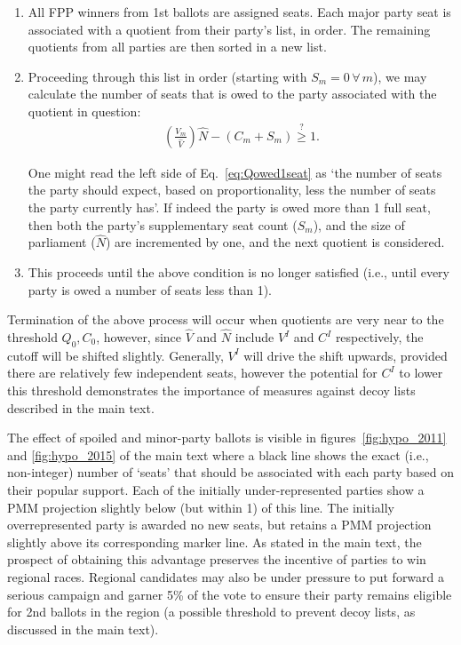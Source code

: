 \begin{enumerate}
\item All FPP winners from 1st ballots are assigned seats. 
Each major party seat is associated with a quotient from their party's list, in order. The remaining quotients from all parties are then sorted in a new list.

\item Proceeding through this list in order (starting with $S_m=0 \, \forall \, m$), we may calculate the number of seats that is owed to the party associated with the quotient in question:
\begin{align}
\left(\frac{V_m}{\hat{V}}\right) \hat{N} -(C_m+S_m)\stackrel{?}{\ge} 1.
\label{eq:Qowed1seat}
\end{align} 

One might read the left side of Eq.~\ref{eq:Qowed1seat} as `the number of seats the party should expect, based on proportionality, less the number of seats the party currently has'.
If indeed the party is owed more than 1 full seat, then both the party's supplementary seat count ($S_m$), and the size of parliament ($\hat{N}$) are incremented by one, and the next quotient is considered. 

\item This proceeds until the above condition is no longer satisfied (i.e., until every party is owed a number of seats less than 1). 
\end{enumerate}

Termination of the above process will occur when quotients are very near to the threshold $Q_0,C_0$, however, since $\hat{V}$ and $\hat{N}$ include $V^I$ and $C^I$ respectively, the cutoff will be shifted slightly.
Generally, $V^I$ will drive the shift upwards, provided there are relatively few independent seats, however the potential for $C^I$ to lower this threshold demonstrates the importance of measures against decoy lists described in the main text.

The effect of spoiled and minor-party ballots is visible in figures~\ref{fig:hypo_2011} and \ref{fig:hypo_2015} of the main text where a black line shows the exact (i.e., non-integer) number of `seats' that should be associated with each party based on their popular support. 
Each of the initially under-represented parties show a PMM projection slightly below (but within 1) of this line. The initially overrepresented party is awarded no new seats, but retains a PMM projection slightly above its corresponding marker line.
As stated in the main text, the prospect of obtaining this advantage preserves the incentive of parties to win regional races.
Regional candidates may also be under pressure to put forward a serious campaign and garner 5\% of the vote to ensure their party remains eligible for 2nd ballots in the region (a possible threshold to prevent decoy lists, as discussed in the main text). 

